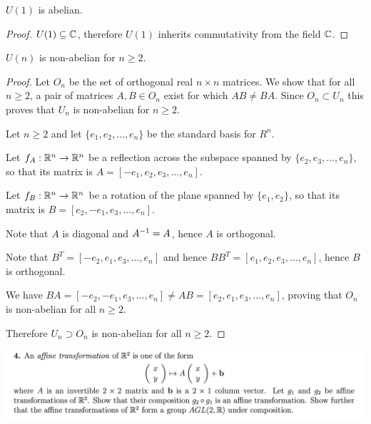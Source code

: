 \documentclass[12pt]{article}
\begin{document}
\begin{claim*}
  $U(1)$ is abelian.
\end{claim*}

\begin{proof}
  $U(1) \subseteq \mathbb{C}$, therefore $U(1)$ inherits commutativity from the field $\mathbb{C}$.
\end{proof}

\begin{claim*}
  $U(n)$ is non-abelian for $n \geq 2$.
\end{claim*}

\begin{proof}Let $O_n$ be the set of orthogonal real $n \times n$ matrices. We show that for all
  $n \geq 2$, a pair of matrices $A, B \in O_n$ exist for which $AB \neq BA$. Since
  $O_n \subset U_n$ this proves that $U_n$ is non-abelian for $n \geq 2$.

  Let $n \geq 2$ and let $\{e_1, e_2, \ldots, e_n\}$ be the standard basis for $R^n$.


  Let $f_A:\mathbb{R}^n\to\mathbb{R}^n$ be a reflection across the subspace spanned by $\{e_2, e_3, \ldots, e_n\}$,
  so that its matrix is $A = [-e_1, e_2, e_3, \ldots, e_n]$.

  Let $f_B:\mathbb{R}^n\to\mathbb{R}^n$ be a rotation of the plane spanned by $\{e_1, e_2\}$, so that its matrix is
  $B = [e_2, -e_1, e_3, \ldots, e_n]$.

  Note that $A$ is diagonal and $A^{-1} = A$, hence $A$ is orthogonal.

  Note that $B^T = [-e_2, e_1, e_3, \ldots, e_n]$ and hence $BB^T = [e_1, e_2, e_3, \ldots, e_n]$,
  hence $B$ is orthogonal.

  We have $BA = [-e_2, -e_1, e_3, \ldots, e_n] \neq AB = [e_2, e_1, e_3, \ldots, e_n]$, proving
  that $O_n$ is non-abelian for all $n \geq 2$.

  Therefore $U_n \supset O_n$ is non-abelian for all $n \geq 2$.
\end{proof}
\newpage
\begin{mdframed}
\includegraphics[width=400pt]{img/oxford-prelims-M1-groups-1-4.png}
\end{mdframed}
\end{document}
